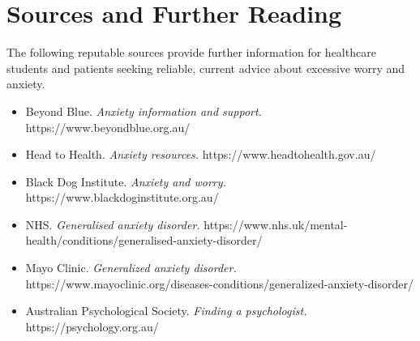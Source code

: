 \section*{Sources and Further Reading}
The following reputable sources provide further information for healthcare students and patients seeking reliable, current advice about excessive worry and anxiety.
\begin{itemize}
    \item Beyond Blue. \textit{Anxiety information and support.} https://www.beyondblue.org.au/
    \item Head to Health. \textit{Anxiety resources.} https://www.headtohealth.gov.au/
    \item Black Dog Institute. \textit{Anxiety and worry.} https://www.blackdoginstitute.org.au/
    \item NHS. \textit{Generalised anxiety disorder.} https://www.nhs.uk/mental-health/conditions/generalised-anxiety-disorder/
    \item Mayo Clinic. \textit{Generalized anxiety disorder.} https://www.mayoclinic.org/diseases-conditions/generalized-anxiety-disorder/
    \item Australian Psychological Society. \textit{Finding a psychologist.} https://psychology.org.au/
\end{itemize}
